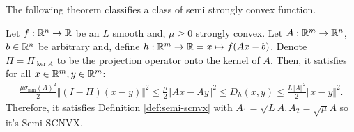 \documentclass[12pt]{article}
\begin{document}
        The following theorem classifies a class of semi strongly convex function. 
        \begin{theorem}\label{thm:aff-smooth-sq-scnvx}
            Let $f: \mathbb R^n \rightarrow \mathbb R$ be an $L$ smooth and, $\mu \ge 0$ strongly convex.
            Let $A: \mathbb R^m \rightarrow \mathbb R^n$, $b \in \mathbb R^n$ be arbitrary and, define $h: \mathbb R^m \rightarrow \mathbb R= x \mapsto f(Ax - b)$. 
            Denote $\Pi = \Pi_{\ker A}$ to be the projection operator onto the kernel of $A$. 
            Then, it satisfies for all $x \in \mathbb R^m, y \in \mathbb R^m$:  
            \begin{align*}
                \frac{\mu \sigma_{\min}(A)^2}{2}\Vert (I - \Pi)(x - y)\Vert^2
                \le \frac{\mu}{2}\Vert Ax - Ay\Vert^2 
                \le D_h(x, y) \le \frac{L\Vert A\Vert^2}{2}\Vert x - y\Vert^2. 
            \end{align*}
            Therefore, it satisfies Definition \ref{def:semi-scnvx} with $A_1 = \sqrt{L}A, A_2 = \sqrt{\mu}A$ so it's Semi-SCNVX. 
        \end{theorem}
\end{document}
